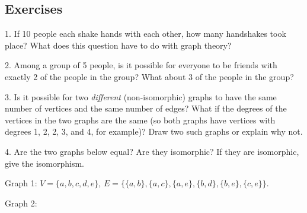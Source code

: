 \documentclass[10pt,]{book}
\theoremstyle{plain}
\theoremstyle{definition}
\theoremstyle{definition}
\theoremstyle{definition}
\numberwithin{equation}{chapter}
\newcommand{\vtx}[2]{node[fill,circle,inner sep=0pt, minimum size=4pt,label=#1:#2]{}}
\newcommand{\vr}[1]{\vtx{right}{#1}}
\newcommand{\vl}[1]{\vtx{left}{#1}}
\begin{document}
\subsection[Exercises]{Exercises}\label{exercises-25}
\begin{exerciselist}
\item[1.]\hypertarget{exercise-265}{}
If 10 people each shake hands with each other, how many handshakes took place? What does this question have to do with graph theory?
%
\par\smallskip
\item[2.]\hypertarget{exercise-266}{}
Among a group of 5 people, is it possible for everyone to be friends with exactly 2 of the people in the group? What about 3 of the people in the group?
%
\par\smallskip
\item[3.]\hypertarget{exercise-267}{}
Is it possible for two \emph{different} (non-isomorphic) graphs to have the same number of vertices and the same number of edges? What if the degrees of the vertices in the two graphs are the same (so both graphs have vertices with degrees 1, 2, 2, 3, and 4, for example)? Draw two such graphs or explain why not.
%
\par\smallskip
\item[4.]\hypertarget{exercise-268}{}
Are the two graphs below equal? Are they isomorphic? If they are isomorphic, give the isomorphism.
%
\par

Graph 1: \(V = \{a,b,c,d,e\}\), \(E = \{\{a,b\}, \{a,c\}, \{a,e\}, \{b,d\}, \{b,e\}, \{c,e\}\}\).
%
\par

Graph 2:
	{
}



\end{exerciselist}
\end{document}
